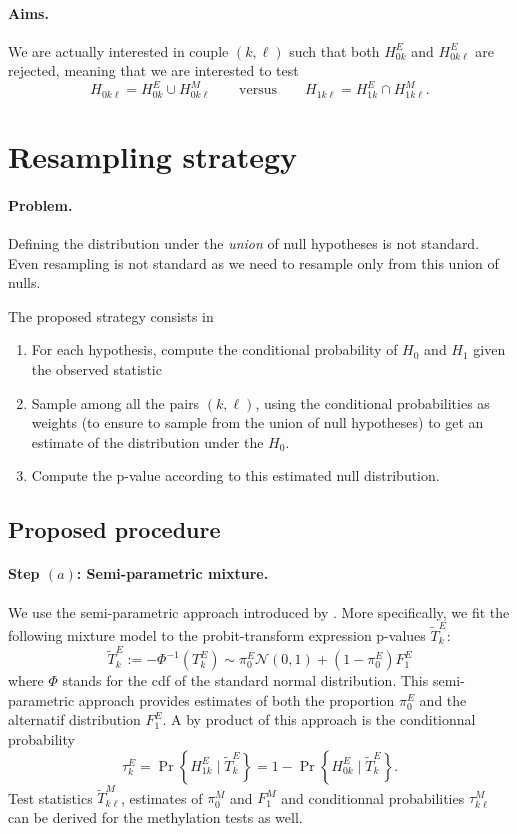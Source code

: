 \documentclass[a4paper, 11pt]{article}
\newcommand{\Ncal}{\mathcal{N}}
\newcommand{\Tt}{\widetilde{T}}
\begin{document}
\paragraph{Aims.} We are actually interested in couple $(k, \ell)$ such that both 
$H_{0k}^E$ and $H_{0k\ell}^E$ are rejected, meaning that we are interested to test
$$
H_{0k\ell} = H_{0k}^E \cup H_{0k\ell}^M
\qquad \text{versus} \qquad 
H_{1k\ell} = H_{1k}^E \cap H_{1k\ell}^M.
$$

\section{Resampling strategy}

\paragraph{Problem.} Defining the distribution under the {\sl union} of null hypotheses is not standard. Even resampling is not standard as we need to resample only from this union of nulls.

The proposed strategy consists in
\begin{enumerate}[($a$)]
 \item For each hypothesis, compute the conditional probability of $H_0$ and $H_1$ given the observed statistic
 \item Sample among all the pairs $(k, \ell)$, using the conditional probabilities as weights (to ensure to sample from the union of null hypotheses) to get an estimate of the distribution under the $H_0$.
 \item Compute the p-value according to this estimated null distribution.
\end{enumerate}

\subsection{Proposed procedure}

\paragraph{Step $(a)$: Semi-parametric mixture.} We use the semi-parametric approach introduced by \cite{RBD07}. More specifically, we fit the following mixture model to the probit-transform expression p-values $\Tt^E_k$:
$$
\Tt^E_k := -\Phi^{-1}(T^E_k) \sim \pi^E_0 \Ncal(0, 1) + (1 - \pi^E_0) F^E_1
$$
where $\Phi$ stands for the cdf of the standard normal distribution. This semi-parametric approach provides estimates of both the proportion $\pi^E_0$ and the alternatif distribution $F^E_1$. A by product of this approach is the conditionnal probability
$$
\tau^E_k = \Pr\left\{H^E_{1k} \mid \Tt^E_k\right\} = 1 - \Pr\left\{H^E_{0k} \mid \Tt^E_k\right\}.
$$
Test statistics $\Tt^M_{k\ell}$, estimates of $\pi^M_0$ and $F^M_1$ and conditionnal probabilities $\tau^M_{k\ell}$ can be derived for the methylation tests as well.
\end{document}
